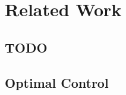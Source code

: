 
\section{Related Work}
\label{sec:related_work}

\subsection{TODO}
\label{ssec:sota_vin}

\subsection{Optimal Control}
\label{ssec:sota_semantic_segmentation}